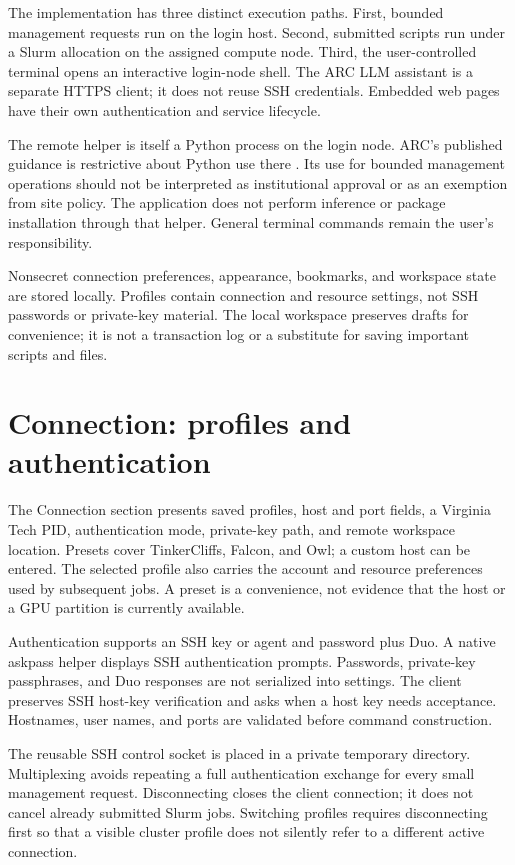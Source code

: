 \documentclass[manuscript,screen,nonacm]{acmart}
\begin{document}
The implementation has three distinct execution paths. First, bounded management requests run on the login host. Second, submitted scripts run under a Slurm allocation on the assigned compute node. Third, the user-controlled terminal opens an interactive login-node shell. The ARC LLM assistant is a separate HTTPS client; it does not reuse SSH credentials. Embedded web pages have their own authentication and service lifecycle.

The remote helper is itself a Python process on the login node. ARC's published guidance is restrictive about Python use there \cite{arcpolicy}. Its use for bounded management operations should not be interpreted as institutional approval or as an exemption from site policy. The application does not perform inference or package installation through that helper. General terminal commands remain the user's responsibility.

Nonsecret connection preferences, appearance, bookmarks, and workspace state are stored locally. Profiles contain connection and resource settings, not SSH passwords or private-key material. The local workspace preserves drafts for convenience; it is not a transaction log or a substitute for saving important scripts and files.

\section{Connection: profiles and authentication}

The Connection section presents saved profiles, host and port fields, a Virginia Tech PID, authentication mode, private-key path, and remote workspace location. Presets cover TinkerCliffs, Falcon, and Owl; a custom host can be entered. The selected profile also carries the account and resource preferences used by subsequent jobs. A preset is a convenience, not evidence that the host or a GPU partition is currently available.

Authentication supports an SSH key or agent and password plus Duo. A native askpass helper displays SSH authentication prompts. Passwords, private-key passphrases, and Duo responses are not serialized into settings. The client preserves SSH host-key verification and asks when a host key needs acceptance. Hostnames, user names, and ports are validated before command construction.

The reusable SSH control socket is placed in a private temporary directory. Multiplexing avoids repeating a full authentication exchange for every small management request. Disconnecting closes the client connection; it does not cancel already submitted Slurm jobs. Switching profiles requires disconnecting first so that a visible cluster profile does not silently refer to a different active connection.
\end{document}
